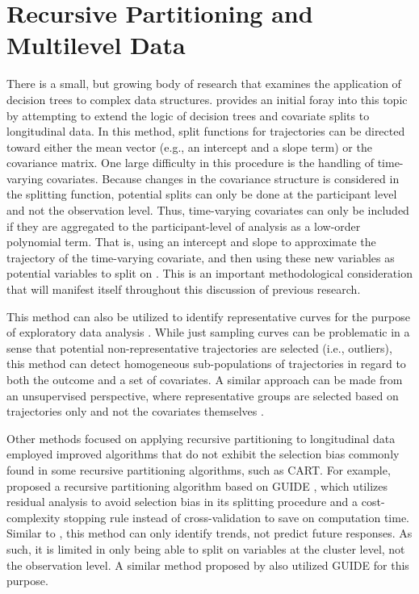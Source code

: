 
\chapter{Recursive Partitioning and Multilevel Data} %

\label{ch:previous} %

	There is a small, but growing body of research that examines the application of decision trees to complex data structures.  provides an initial foray into this topic by attempting to extend the logic of decision trees and covariate splits to longitudinal data. In this method, split functions for trajectories can be directed toward either the mean vector (e.g., an intercept and a slope term) or the covariance matrix. One large difficulty in this procedure is the handling of time-varying covariates. Because changes in the covariance structure is considered in the splitting function, potential splits can only be done at the participant level and not the observation level. Thus, time-varying covariates can only be included if they are aggregated to the participant-level of analysis as a low-order polynomial term. That is, using an intercept and slope to approximate the trajectory of the time-varying covariate, and then using these new variables as potential variables to split on \cite{segal1992tree}. This is an important methodological consideration that will manifest itself throughout this discussion of previous research.


	This method can also be utilized to identify representative curves for the purpose of exploratory data analysis \cite{segal1994representative}. While just sampling curves can be problematic in a sense that potential non-representative trajectories are selected (i.e., outliers), this method can detect homogeneous sub-populations of trajectories in regard to both the outcome and a set of covariates. A similar approach can be made from an unsupervised perspective, where representative groups are selected based on trajectories only and not the covariates themselves \cite{martin2014growth, tucker1966}.


	Other methods focused on applying recursive partitioning to longitudinal data employed improved algorithms that do not exhibit the selection bias commonly found in some recursive partitioning algorithms, such as CART. For example,  proposed a recursive partitioning algorithm based on GUIDE \cite{loh2002regression}, which utilizes residual analysis to avoid selection bias in its splitting procedure and a cost-complexity stopping rule instead of cross-validation to save on computation time. Similar to , this method can only identify trends, not predict future responses. As such, it is limited in only being able to split on variables at the cluster level, not the observation level. A similar method proposed by  also utilized GUIDE for this purpose.


